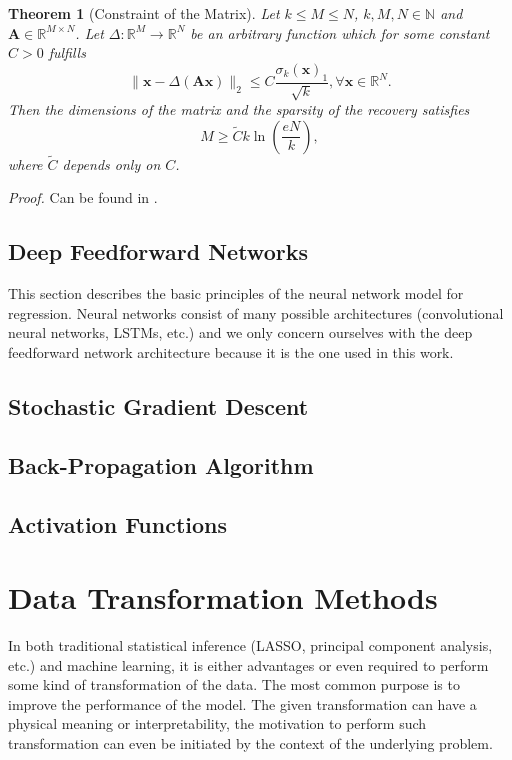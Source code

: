 \documentclass[11pt,oneside,czech,american]{book} %
\theoremstyle{plain}
\newtheorem{thm}{Theorem}
\theoremstyle{definition}
\begin{document}
\begin{thm}[Constraint of the Matrix]
	Let $k \leq M \leq N$, $k,M,N \in \mathbb{N}$ and $\bm{A} \in \mathbb{R}^{M \times N}$. Let $\Delta: \mathbb{R}^M \rightarrow \mathbb{R}^N$ be an arbitrary function which for some constant $C>0$ fulfills
	\begin{equation}
		\lVert \bm{x} - \Delta(\bm{Ax}) \rVert_2 \leq C \frac{\sigma_k(\bm{x})_1}{\sqrt{k}}, \forall \bm{x} \in \mathbb{R}^N.
	\end{equation}
Then the dimensions of the matrix and the sparsity of the recovery satisfies
\begin{equation}
	M \geq \tilde{C}k \ln(\frac{eN}{k}),
	\label{divnanerovnost}
\end{equation}
where $\tilde{C}$ depends only on $C$.
\end{thm}
\emph{Proof.} Can be found in \parencite{boche15}.

\subsection{Deep Feedforward Networks}
This section describes the basic principles of the neural network model for regression. Neural networks consist of many possible architectures (convolutional neural networks, LSTMs, etc.) and we only concern ourselves with the deep feedforward network architecture because it is the one used in this work.
\subsection*{Stochastic Gradient Descent}
\subsection*{Back-Propagation Algorithm}
\subsection*{Activation Functions}

\section{Data Transformation Methods}
In both traditional statistical inference (LASSO, principal component analysis, etc.) and machine learning, it is either advantages or even required to perform some kind of transformation of the data. The most common purpose is to improve the performance of the model. The given transformation can have a physical meaning or interpretability, the motivation to perform such transformation can even be initiated by the context of the underlying problem.
\end{document}
